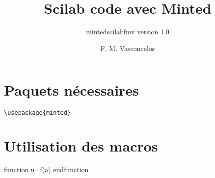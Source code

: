 \documentclass[a4paper,9pt]{article}
\title{Scilab code avec Minted}
\subtitle{mintedscilabfmv version 1.0}
\author{F. M. Vasconcelos}
\date{}
\begin{document}
\maketitle
\begin{abstract}
\end{abstract}

\section{Paquets nécessaires}                                                         
\begin{verbatim}                                                                      
\usepackage{minted}
\end{verbatim} 
\section{Utilisation des macros}                                                         
\begin{Scilabcode}
    function u=f(a)
    endfunction
\end{Scilabcode}
\begin{tcolorbox}[enhanced,
                  breakable,
                  sharpish corners,
                  width=\linewidth,
                  colframe=white,
                  colback=blue!8]
\end{tcolorbox}
\end{document}
